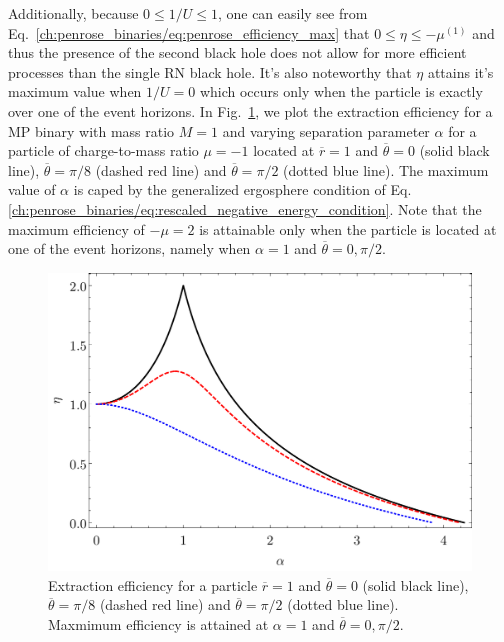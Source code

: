 Additionally, because $0 \leq 1/U \leq 1$, one can easily see from Eq.~\eqref{ch:penrose_binaries/eq:penrose_efficiency_max} that $0 \leq \eta \leq -\mu^{(1)}$ and thus the presence of the second black hole does not allow for more efficient processes than the single RN black hole. It's also noteworthy that $\eta$ attains it's maximum value when $1/U = 0$ which occurs only when the particle is exactly over one of the event horizons. In Fig.~\ref{ch:penrose_binaries/fig:efficiency}, we plot the extraction efficiency for a MP binary with mass ratio $M = 1$ and varying separation parameter $\alpha$ for a particle of charge-to-mass ratio $\mu = -1$ located at $\overline{r} = 1$ and $\overline{\theta} = 0$ (solid black line), $\overline{\theta} = \pi/8$ (dashed red line) and $\overline{\theta} = \pi/2$ (dotted blue line). The maximum value of $\alpha$ is caped by the generalized ergosphere condition of Eq.\eqref{ch:penrose_binaries/eq:rescaled_negative_energy_condition}. Note that the maximum efficiency of $-\mu = 2$ is attainable only when the particle is located at one of the event horizons, namely when $\alpha = 1$ and $\overline{\theta} = 0,\pi/2$.

\begin{figure}[!htbp]
  \centering
  \includegraphics[scale = 0.4]{img/penrose_binaries/mp/efficiency.pdf}
  \caption{Extraction efficiency for a particle $\overline{r} = 1$ and $\overline{\theta} = 0$ (solid black line), $\overline{\theta} = \pi/8$ (dashed red line) and $\overline{\theta} = \pi/2$ (dotted blue line). Maxmimum efficiency is attained at $\alpha = 1$ and $\overline{\theta} = 0,\pi/2$.}
  \label{ch:penrose_binaries/fig:efficiency}
\end{figure}

